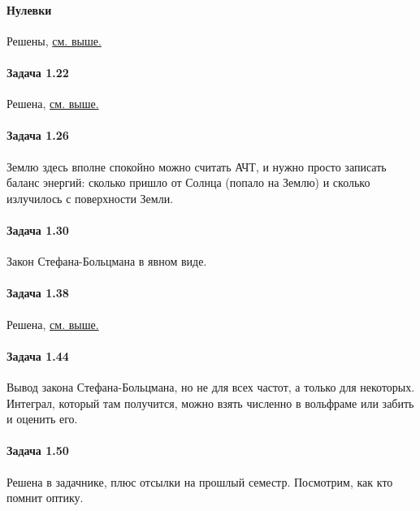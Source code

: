 \documentclass[12pt]{article}
\begin{document}
\paragraph{Нулевки} Решены, \hyperref[task_011]{см. выше.}
\paragraph{Задача 1.22} Решена, \hyperref[task_122]{см. выше.}
\paragraph{Задача 1.26} Землю здесь вполне спокойно можно считать АЧТ, и нужно просто записать баланс энергий: сколько пришло от Солнца (попало на Землю) и сколько излучилось с поверхности Земли.
\paragraph{Задача 1.30} Закон Стефана-Больцмана в явном виде.
\paragraph{Задача 1.38} Решена, \hyperref[task_138]{см. выше.}
\paragraph{Задача 1.44} Вывод закона Стефана-Больцмана, но не для всех частот, а только для некоторых. Интеграл, который там получится, можно взять численно в вольфраме или забить и оценить его.
\paragraph{Задача 1.50} Решена в задачнике, плюс отсылки на прошлый семестр. Посмотрим, как кто помнит оптику.
\end{document}
